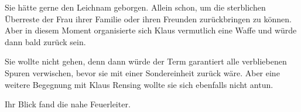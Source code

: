 Sie hätte gerne den Leichnam geborgen. Allein schon, um die sterblichen Überreste der Frau ihrer Familie oder ihren Freunden zurückbringen zu können. Aber in diesem Moment organisierte sich Klaus vermutlich eine Waffe und würde dann bald zurück sein.

\par

Sie wollte nicht gehen, denn dann würde der Term garantiert alle verbliebenen Spuren verwischen, bevor sie mit einer Sondereinheit zurück wäre. Aber eine weitere Begegnung mit Klaus Rensing wollte sie sich ebenfalls nicht antun.

\par

Ihr Blick fand die nahe Feuerleiter.
